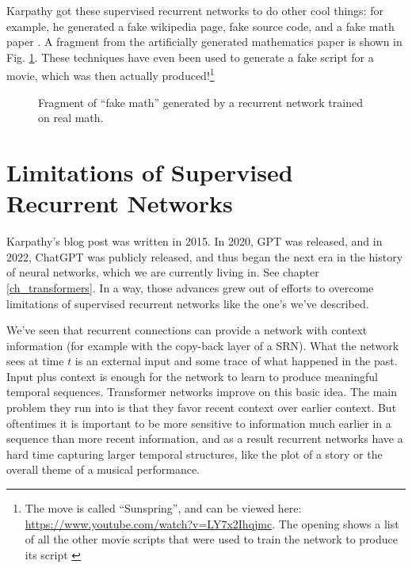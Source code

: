 Karpathy got these supervised recurrent networks to do other cool things:  for example, he generated a fake wikipedia page, fake source code, and a fake math paper \cite{karpathy2015unreasonable}. A fragment from the artificially generated mathematics paper is shown in Fig. \ref{fakeMath}. These techniques have even been used to generate a fake script for a movie, which was then actually produced!\footnote{The move is called ``Sunspring'', and can be viewed here: \url{https://www.youtube.com/watch?v=LY7x2Ihqjmc}. The opening shows a list of all the other movie scripts that were used to train the network to produce its script \cite{newitz2016movie}}

\begin{figure}[h]
\centering
{}
\caption[From Karpathy, 2015 \cite{karpathy2015unreasonable}.]{Fragment of ``fake math'' generated by a recurrent network trained on real math.}
\label{fakeMath}
\end{figure}

\section{Limitations of Supervised Recurrent Networks}\label{supervisedRecurrentLimitations}

Karpathy's blog post was written in 2015. In 2020, GPT was released, and in 2022, ChatGPT was publicly released, and thus began the next era in the history of neural networks, which we are currently living in. See chapter \ref{ch_transformers}. In a way, those advances grew out of efforts to overcome limitations of supervised recurrent networks like the one's we've described.

We've seen that recurrent connections can provide a network with context information (for example with the copy-back layer of a SRN). What the network sees at time $t$ is an external input and some trace of what happened in the past.  Input plus context is enough for the network to learn to produce meaningful temporal sequences. Transformer networks improve on this basic idea. The main problem they run into is that they favor recent context over earlier context.  But oftentimes it is important to be more sensitive to information much earlier in a sequence than more recent information, and as a result recurrent networks have a hard time capturing larger temporal structures,  like the plot of a story or the overall theme of a musical performance. 

